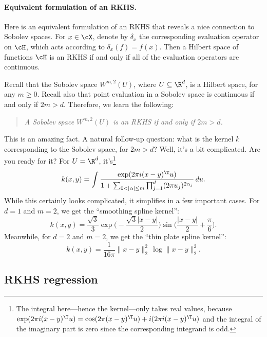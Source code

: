 \documentclass{article}
\begin{document}
\paragraph{Equivalent formulation of an RKHS.}

Here is an equivalent formulation of an RKHS that reveals a nice connection to
Sobolev spaces. For $x \in \cX$, denote by $\delta_x$ the corresponding
evaluation operator on $\cH$, which acts according to $\delta_x(f) = f(x)$. Then
a Hilbert space of functions $\cH$ is an RKHS if and only if all of the
evaluation operators are continuous.  

Recall that the Sobolev space $W^{m,2}(U)$, where $U \subseteq \R^d$, is a
Hilbert space, for any $m \geq 0$. Recall also that point evaluation in a
Sobolev space is continuous if and only if $2m > d$. Therefore, we learn the
following:       
\begin{quote}
\centering\it
A Sobolev space $W^{m,2}(U)$ is an RKHS if and only if $2m > d$.
\end{quote}
This is an amazing fact. A natural follow-up question: what is the kernel $k$
corresponding to the Sobolev space, for $2m > d$? Well, it's a bit
complicated. Are you ready for it? For $U = \R^d$, it's\footnote{The integral 
  here---hence the kernel---only takes real values, because $\exp(2\pi i
  (x-y)^\T u) = \cos(2\pi(x-y)^\T u) + i (2\pi i (x-y)^\T u)$ and the integral
  of the imaginary part is zero since the corresponding integrand is odd.}  
\[
k(x,y) = \int \frac{\exp(2\pi i (x-y)^\T u)}{1 + \sum_{0 < |\alpha| \leq m}
  \prod_{j=1}^d (2\pi u_j)^{2\alpha_j}} \, du.
\]
While this certainly looks complicated, it simplifies in a few important cases.  
For $d=1$ and $m=2$, we get the ``smoothing spline kernel'': 
\begin{equation}
\label{eq:ss_rkhs}
k(x,y) = \frac{\sqrt{3}}{3} \exp\bigg( -\frac{\sqrt{3}|x-y|}{2} \bigg) 
\sin\bigg( \frac{|x-y|}{2} + \frac{\pi}{6} \bigg).
\end{equation}
Meanwhile, for $d=2$ and $m=2$, we get the ``thin plate spline kernel'': 
\begin{equation}
\label{eq:tp_rkhs}
k(x,y) = \frac{1}{16 \pi} \|x-y\|_2^2 \, \log \|x-y\|_2^2.
\end{equation}

\subsection{RKHS regression}
\end{document}
